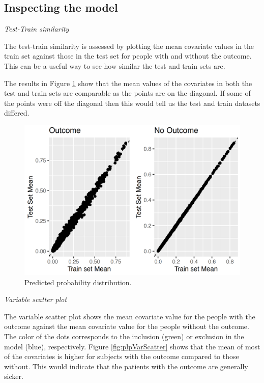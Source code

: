\documentclass[11pt]{book}
\theoremstyle{definition}
\theoremstyle{definition}
\theoremstyle{definition}
\theoremstyle{remark}
\begin{document}
\hypertarget{inspecting-the-model}{%
\subsection{Inspecting the model}\label{inspecting-the-model}}

\emph{Test-Train similarity}

The test-train similarity is assessed by plotting the mean covariate values in the train set against those in the test set for people with and without the outcome. This can be a useful way to see how similar the test and train sets are.

The results in Figure \ref{fig:plpTestTrain} show that the mean values of the covariates in both the test and train sets are comparable as the points are on the diagonal. If some of the points were off the diagonal then this would tell us the test and train datasets differed.

\begin{figure}

{\centering \includegraphics[width=1\linewidth]{images/PatientLevelPrediction/generalizability} 

}

\caption{Predicted probability distribution.}\label{fig:plpTestTrain}
\end{figure}

\emph{Variable scatter plot}

The variable scatter plot shows the mean covariate value for the people with the outcome against the mean covariate value for the people without the outcome. The color of the dots corresponds to the inclusion (green) or exclusion in the model (blue), respectively. Figure \ref{fig:plpVarScatter} shows that the mean of most of the covariates is higher for subjects with the outcome compared to those without. This would indicate that the patients with the outcome are generally sicker.
\end{document}
